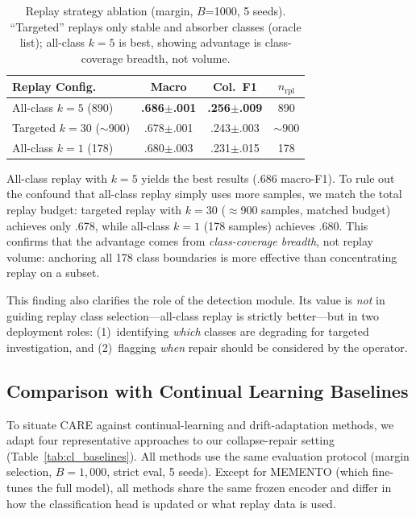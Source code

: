 \documentclass[journal]{IEEEtran}
\newcommand{\ours}{CARE}  %
\begin{document}
\begin{table}[t]
\centering
\caption{Replay strategy ablation (margin, $B$=1000, 5 seeds). ``Targeted'' replays only stable and absorber classes (oracle list); all-class $k{=}5$ is best, showing advantage is class-coverage breadth, not volume.}
\label{tab:replay_ablation}
\scriptsize
\setlength{\tabcolsep}{3pt}
\begin{tabular}{@{}l cc c@{}}
\toprule
Replay Config. & Macro & Col.\ F1 & $n_{\text{rpl}}$ \\
\midrule
All-class $k{=}5$ (890) & \textbf{.686$\pm$.001} & \textbf{.256$\pm$.009} & 890 \\
Targeted $k{=}30$ (${\sim}$900) & .678$\pm$.001 & .243$\pm$.003 & $\sim$900 \\
All-class $k{=}1$ (178) & .680$\pm$.003 & .231$\pm$.015 & 178 \\
\bottomrule
\end{tabular}
\end{table}

All-class replay with $k{=}5$ yields the best results (.686 macro-F1).
To rule out the confound that all-class replay simply uses more samples, we match the total replay budget: targeted replay with $k{=}30$ (${\approx}$900 samples, matched budget) achieves only .678, while all-class $k{=}1$ (178 samples) achieves .680.
This confirms that the advantage comes from \textit{class-coverage breadth}, not replay volume: anchoring all 178 class boundaries is more effective than concentrating replay on a subset.

This finding also clarifies the role of the detection module.
Its value is \textit{not} in guiding replay class selection---all-class replay is strictly better---but in two deployment roles: (1)~identifying \textit{which} classes are degrading for targeted investigation, and (2)~flagging \textit{when} repair should be considered by the operator.

\subsection{Comparison with Continual Learning Baselines}
\label{sec:cl_baselines}

To situate \ours{} against continual-learning and drift-adaptation methods, we adapt four representative approaches to our collapse-repair setting (Table~\ref{tab:cl_baselines}).
All methods use the same evaluation protocol (margin selection, $B{=}1{,}000$, strict eval, 5 seeds). Except for MEMENTO (which fine-tunes the full model), all methods share the same frozen encoder and differ in how the classification head is updated or what replay data is used.
\end{document}
